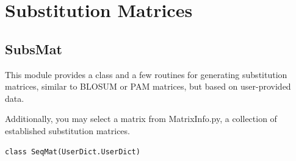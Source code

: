 \documentclass{report}
\begin{document}
\section{Substitution Matrices}

\subsection{SubsMat}

This module provides a class and a few routines for generating substitution matrices, similar to BLOSUM or PAM matrices, but based on user-provided data.

Additionally, you may select a matrix from MatrixInfo.py, a collection of established substitution matrices.

\begin{verbatim}
class SeqMat(UserDict.UserDict)
\end{verbatim}
\end{document}
